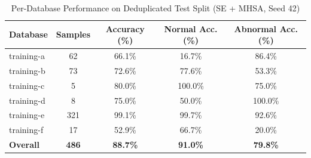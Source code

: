 \begin{table}[t]
\centering
\caption{Per-Database Performance on Deduplicated Test Split (SE + MHSA, Seed 42)}
\label{tab:subset_dedup}
\begin{tabular}{lcccc}
\toprule
\textbf{Database} & \textbf{Samples} & \textbf{Accuracy (\%)} & \textbf{Normal Acc. (\%)} & \textbf{Abnormal Acc. (\%)} \\
\midrule
training-a &  62 & 66.1\% & 16.7\% & 86.4\% \\
training-b &  73 & 72.6\% & 77.6\% & 53.3\% \\
training-c &   5 & 80.0\% & 100.0\% & 75.0\% \\
training-d &   8 & 75.0\% & 50.0\% & 100.0\% \\
training-e & 321 & 99.1\% & 99.7\% & 92.6\% \\
training-f &  17 & 52.9\% & 66.7\% & 20.0\% \\
\midrule
\textbf{Overall} & \textbf{486} & \textbf{88.7\%} & \textbf{91.0\%} & \textbf{79.8\%} \\
\bottomrule
\end{tabular}
\end{table}
